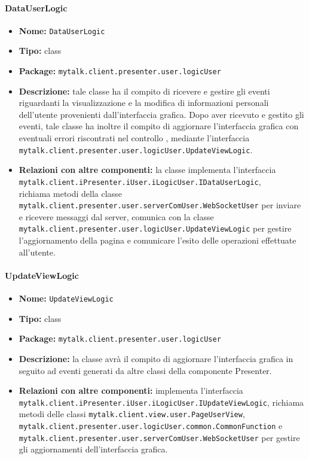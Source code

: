 \paragraph{DataUserLogic}{
	\begin{itemize}
		\item [] \textbf{Nome:} \texttt{DataUserLogic}
		\item [] \textbf{Tipo:} class
		\item [] \textbf{Package:} \texttt{mytalk.client.presenter.user.logicUser}
		\item [] \textbf{Descrizione:} tale classe ha il compito di ricevere e gestire gli eventi riguardanti la visualizzazione e la modifica di informazioni personali dell'utente provenienti dall'interfaccia grafica. Dopo aver ricevuto e gestito gli eventi, tale classe ha inoltre il compito di aggiornare l'interfaccia grafica con eventuali errori riscontrati nel controllo , mediante l'interfaccia\\ \texttt{mytalk.client.presenter.user.logicUser.UpdateViewLogic}.
		\item [] \textbf{Relazioni con altre componenti:} la classe implementa l'interfaccia\\ \texttt{mytalk.client.iPresenter.iUser.iLogicUser.IDataUserLogic},\\ richiama metodi della classe \\ \texttt{mytalk.client.presenter.user.serverComUser.WebSocketUser} per inviare e ricevere messaggi dal server\g, comunica con la classe\\ \texttt{mytalk.client.presenter.user.logicUser.UpdateViewLogic} per gestire l'aggiornamento della pagina e comunicare l'esito delle operazioni effettuate all'utente.
	\end{itemize}
}
\paragraph{UpdateViewLogic}{
	\begin{itemize}
		\item [] \textbf{Nome:} \texttt{UpdateViewLogic}
		\item [] \textbf{Tipo:} class
		\item [] \textbf{Package:} \texttt{mytalk.client.presenter.user.logicUser}
		\item [] \textbf{Descrizione:} la classe avrà il compito di aggiornare l'interfaccia grafica in seguito ad eventi generati da altre classi della componente Presenter.
		\item [] \textbf{Relazioni con altre componenti:} implementa l'interfaccia\\ \texttt{mytalk.client.iPresenter.iUser.iLogicUser.IUpdateViewLogic}, richiama metodi delle classi \texttt{mytalk.client.view.user.PageUserView},\\ \texttt{mytalk.client.presenter.user.logicUser.common.CommonFunction} e\\ \texttt{mytalk.client.presenter.user.serverComUser.WebSocketUser} per gestire gli aggiornamenti dell'interfaccia grafica.
	\end{itemize}
}
